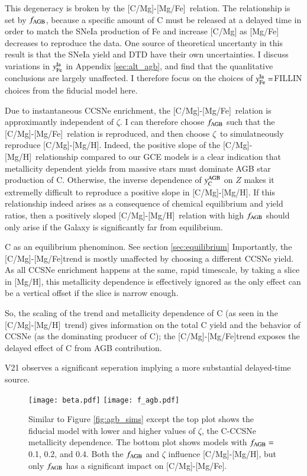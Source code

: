 \documentclass[12pt,oneside]{report}
\newcommand{\caah}{[C/Mg]-[Mg/H]}
\newcommand{\caafe}{[C/Mg]-[Mg/Fe]}
\newcommand{\Ycagb}{\ensuremath{y_{\rm C}^{\rm AGB}}}
\begin{document}
This degeneracy is broken by the \caafe~relation. The relationship is set by $f_{\rm AGB}$, because a specific amount of C must be released at a delayed time in order to match the SNeIa production of Fe and increase [C/Mg] as [Mg/Fe] decreases to reproduce the data.
One source of theoretical uncertanty in this result is that the SNeIa yield and DTD have their own uncertainties. I discuss variations in $y_{\rm Fe}^{\rm Ia}$ in Appendix \ref{sec:alt_agb}, and find that the quanlitative conclusions are largely unaffected. I therefore focus on the choices of $y_{\rm Fe}^{\rm Ia} = $FILLIN choices from the fiducial model here.


Due to instantaneous CCSNe enrichment, the \caafe~relation is approximantly independent of $\zeta$. I can therefore choose $f_{\rm AGB}$ such that the \caafe~relation is reproduced, and then choose $\zeta$~to simulatneously reproduce \caah. Indeed, the positive slope of the \caah~relationship compared to our GCE models is a clear indication that metallicity dependent yields from massive stars must dominate AGB star production of C. Otherwise,  the inverse dependence of $\Ycagb$ on $Z$ makes it extremelly difficult to reproduce a positive slope in \caah. If this relationship indeed arises as a consequence of chemical equilibrium and yield ratios, then a positively sloped \caah~relation with high $f_{\rm AGB}$ should only arise if the Galaxy is significantly far from equilibrium. 

C as an equilibrium phenominon. See section \ref{sec:equilibrium} Importantly, the \caafe trend is mostly unaffected by choosing a different
CCSNe yield. As all CCSNe enrichment happens at the same, rapid timescale, by
taking a slice in [Mg/H], this metallicity dependence is effectively ignored as
the only effect can be a vertical offset if the slice is narrow enough. 

So, the scaling of the trend and metallicity dependence of C (as seen in
the \caah~trend) gives information on the total C yield and the behavior
of CCSNe (as the dominating producer of C);
the \caafe trend exposes the delayed effect of C from AGB contribution.

V21 observes a significant seperation implying a more substantial delayed-time source. 


\begin{figure}
\centering
\texttt{[image: beta.pdf]}
\texttt{[image: f\_agb.pdf]}

\caption[Adjusted yield models]{Similar to Figure \ref{fig:agb_sims} except the top plot shows the fiducial model with lower and higher values of $\zeta$, the C-CCSNe metallicity dependence. The bottom plot shows models with $f_{\rm AGB}=$0.1, 0.2, and 0.4. Both the $f_{\rm AGB}$ and $\zeta$ influence \caah, but only $f_{\rm AGB}$ has a significant impact on \caafe.}
\label{fig:beta_f}
\end{figure}
\end{document}
